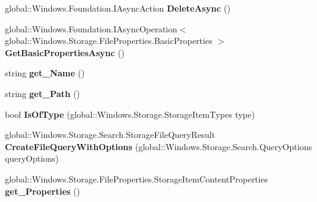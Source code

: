 \begin{DoxyCompactItemize}
\item 
\mbox{\label{class_windows_1_1_storage_1_1_storage_folder_ae60237b6aa50f6820009b4332c8abd48}} 
global\+::\+Windows.\+Foundation.\+I\+Async\+Action {\bfseries Delete\+Async} ()
\item 
\mbox{\label{class_windows_1_1_storage_1_1_storage_folder_ae9c02355139ce9e4530065b3ddfb717f}} 
global\+::\+Windows.\+Foundation.\+I\+Async\+Operation$<$ global\+::\+Windows.\+Storage.\+File\+Properties.\+Basic\+Properties $>$ {\bfseries Get\+Basic\+Properties\+Async} ()
\item 
\mbox{\label{class_windows_1_1_storage_1_1_storage_folder_a722592bfe76cdbc6678e09dca477b4fc}} 
string {\bfseries get\+\_\+\+Name} ()
\item 
\mbox{\label{class_windows_1_1_storage_1_1_storage_folder_a3c76cae5d410f07ee9f03d979f1b81f8}} 
string {\bfseries get\+\_\+\+Path} ()
\item 
\mbox{\label{class_windows_1_1_storage_1_1_storage_folder_aa385666b1143c539c3b9d8bbb270e8d1}} 
bool {\bfseries Is\+Of\+Type} (global\+::\+Windows.\+Storage.\+Storage\+Item\+Types type)
\item 
\mbox{\label{class_windows_1_1_storage_1_1_storage_folder_a61bb687dd56eb8dc8b62c6d031f10c42}} 
global\+::\+Windows.\+Storage.\+Search.\+Storage\+File\+Query\+Result {\bfseries Create\+File\+Query\+With\+Options} (global\+::\+Windows.\+Storage.\+Search.\+Query\+Options query\+Options)
\item 
\mbox{\label{class_windows_1_1_storage_1_1_storage_folder_a00d4c92d7a7b2590b3bee76b0de81d34}} 
global\+::\+Windows.\+Storage.\+File\+Properties.\+Storage\+Item\+Content\+Properties {\bfseries get\+\_\+\+Properties} ()
\item 
\mbox{\label{class_windows_1_1_storage_1_1_storage_folder_a1fb213152c9afc34cd979395c35450f9}} 

\end{DoxyCompactItemize}
